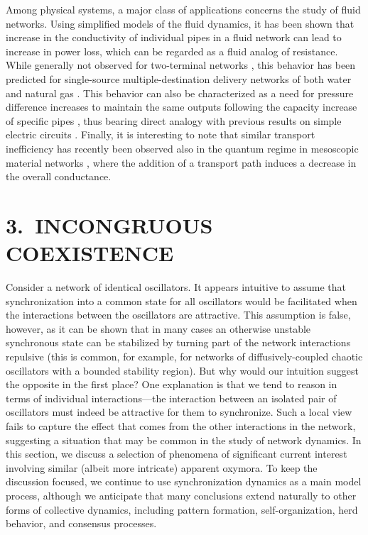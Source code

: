 \documentclass[
preprint,
superscriptaddress,
aps,
prl,
]{revtex4-1}
\begin{document}
{Among physical systems, a major class of applications concerns the study of fluid networks. Using simplified models of the fluid dynamics, it has been shown that increase in the conductivity of individual pipes in a fluid network can lead to increase in power loss, which can be regarded as a fluid analog of resistance. While 
generally not observed for two-terminal networks \cite{calvert1991braess}, 
this behavior has been predicted for single-source multiple-destination delivery networks of both water  \cite{calvert1991braess,keady1995colebrook} and natural gas \cite{andre2010optimization,ayala2013braess}.  
This
behavior can also be characterized as a need 
for
pressure difference 
increases
 to maintain the same outputs 
 following the capacity increase of specific pipes \cite{ayala2013braess}, thus bearing direct analogy with previous results on simple electric circuits \cite{cohen1991paradoxical}. Finally, it is interesting to 
note
that similar transport inefficiency  has recently been observed also in the quantum regime in mesoscopic material networks \cite{pala2012transport,sousa2013braess}, where the  addition of a transport path induces a decrease in the overall conductance.}

\section{3.~INCONGRUOUS COEXISTENCE} 

Consider a network of identical oscillators. It appears intuitive to assume that synchronization into a common state for all oscillators would be facilitated when the interactions between the oscillators are attractive. This assumption is false, however, as it can be shown that in many cases an otherwise unstable synchronous state can be stabilized by turning part of the network interactions repulsive \cite{nishikawa2010network} (this is common, for example, for networks of diffusively-coupled chaotic oscillators with a bounded stability region).
 But why would our intuition suggest the opposite in the first place? 
 One explanation 
 is that we tend to reason in terms of individual interactions---the interaction between an isolated pair of oscillators must indeed  
   {\color{black} be} attractive for them to synchronize.  
Such a local view fails to capture the 
effect that comes from the other interactions in the network, 
suggesting
a situation  
that may be common 
in the study of network dynamics. In this section, we discuss a selection of 
phenomena of significant current interest involving similar (albeit more intricate) 
apparent oxymora.
To keep the discussion focused, we continue to use synchronization dynamics as a main
model process, although we anticipate that many conclusions extend naturally to other 
   {\color{black} forms}
of collective dynamics, including pattern formation, self-organization, herd behavior, 
and consensus processes.
\end{document}

